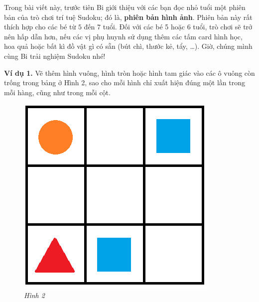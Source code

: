 	\vskip 0.1cm
	Trong bài viết này, trước tiên Bi giới thiệu với các bạn đọc nhỏ tuổi một phiên bản của trò chơi trí tuệ Sudoku; đó là, \textbf{phiên bản hình ảnh}. Phiên bản này rất thích hợp cho các bé từ $5$ đến $7$ tuổi.
	\vskip 0.1cm
	Đối với các bé 5 hoặc 6 tuổi, trò chơi sẽ trở nên hấp dẫn hơn, nếu các vị phụ huynh sử dụng thêm các tấm card hình học, hoa quả hoặc bất kì đồ vật gì có sẵn (bút chì, thước kẻ, tẩy, \ldots).
	\vskip 0.15cm
	Giờ, chúng mình cùng Bi trải nghiệm  Sudoku nhé!
	\begin{multicols}{2}
		\textbf{Ví dụ 1.} Vẽ thêm hình vuông, hình tròn hoặc hình tam giác vào các ô vuông còn trống trong bảng ở Hình 2, sao cho mỗi hình chỉ xuất hiện đúng một lần trong mỗi hàng, cũng như trong mỗi cột.
		\begin{figure}[H]
			\vspace*{5pt}
			\centering
			\captionsetup{labelformat=empty, justification=centering}
			\includegraphics[scale=0.3]{hinh2}
			\caption{\textit{\small Hình 2}}
			\vspace*{-10pt}
		\end{figure}
	\end{multicols}
	
